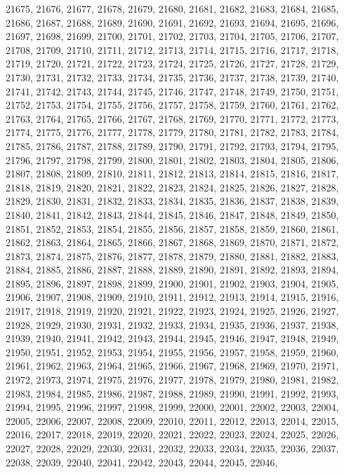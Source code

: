 21675,
21676,
21677,
21678,
21679,
21680,
21681,
21682,
21683,
21684,
21685,
21686,
21687,
21688,
21689,
21690,
21691,
21692,
21693,
21694,
21695,
21696,
21697,
21698,
21699,
21700,
21701,
21702,
21703,
21704,
21705,
21706,
21707,
21708,
21709,
21710,
21711,
21712,
21713,
21714,
21715,
21716,
21717,
21718,
21719,
21720,
21721,
21722,
21723,
21724,
21725,
21726,
21727,
21728,
21729,
21730,
21731,
21732,
21733,
21734,
21735,
21736,
21737,
21738,
21739,
21740,
21741,
21742,
21743,
21744,
21745,
21746,
21747,
21748,
21749,
21750,
21751,
21752,
21753,
21754,
21755,
21756,
21757,
21758,
21759,
21760,
21761,
21762,
21763,
21764,
21765,
21766,
21767,
21768,
21769,
21770,
21771,
21772,
21773,
21774,
21775,
21776,
21777,
21778,
21779,
21780,
21781,
21782,
21783,
21784,
21785,
21786,
21787,
21788,
21789,
21790,
21791,
21792,
21793,
21794,
21795,
21796,
21797,
21798,
21799,
21800,
21801,
21802,
21803,
21804,
21805,
21806,
21807,
21808,
21809,
21810,
21811,
21812,
21813,
21814,
21815,
21816,
21817,
21818,
21819,
21820,
21821,
21822,
21823,
21824,
21825,
21826,
21827,
21828,
21829,
21830,
21831,
21832,
21833,
21834,
21835,
21836,
21837,
21838,
21839,
21840,
21841,
21842,
21843,
21844,
21845,
21846,
21847,
21848,
21849,
21850,
21851,
21852,
21853,
21854,
21855,
21856,
21857,
21858,
21859,
21860,
21861,
21862,
21863,
21864,
21865,
21866,
21867,
21868,
21869,
21870,
21871,
21872,
21873,
21874,
21875,
21876,
21877,
21878,
21879,
21880,
21881,
21882,
21883,
21884,
21885,
21886,
21887,
21888,
21889,
21890,
21891,
21892,
21893,
21894,
21895,
21896,
21897,
21898,
21899,
21900,
21901,
21902,
21903,
21904,
21905,
21906,
21907,
21908,
21909,
21910,
21911,
21912,
21913,
21914,
21915,
21916,
21917,
21918,
21919,
21920,
21921,
21922,
21923,
21924,
21925,
21926,
21927,
21928,
21929,
21930,
21931,
21932,
21933,
21934,
21935,
21936,
21937,
21938,
21939,
21940,
21941,
21942,
21943,
21944,
21945,
21946,
21947,
21948,
21949,
21950,
21951,
21952,
21953,
21954,
21955,
21956,
21957,
21958,
21959,
21960,
21961,
21962,
21963,
21964,
21965,
21966,
21967,
21968,
21969,
21970,
21971,
21972,
21973,
21974,
21975,
21976,
21977,
21978,
21979,
21980,
21981,
21982,
21983,
21984,
21985,
21986,
21987,
21988,
21989,
21990,
21991,
21992,
21993,
21994,
21995,
21996,
21997,
21998,
21999,
22000,
22001,
22002,
22003,
22004,
22005,
22006,
22007,
22008,
22009,
22010,
22011,
22012,
22013,
22014,
22015,
22016,
22017,
22018,
22019,
22020,
22021,
22022,
22023,
22024,
22025,
22026,
22027,
22028,
22029,
22030,
22031,
22032,
22033,
22034,
22035,
22036,
22037,
22038,
22039,
22040,
22041,
22042,
22043,
22044,
22045,
22046,
